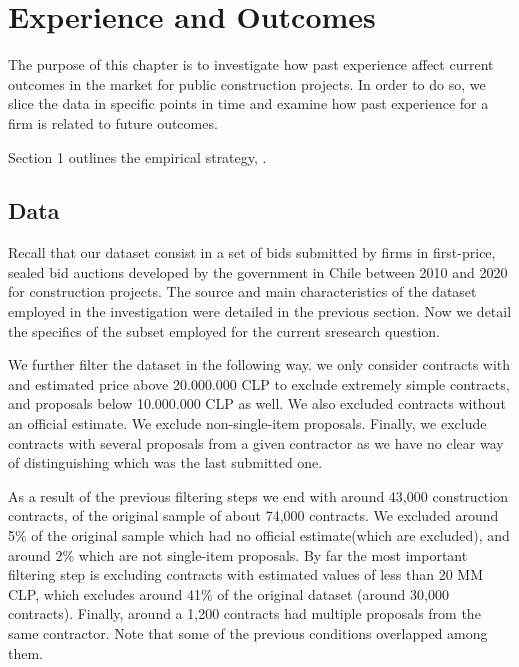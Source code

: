 \chapter{Experience and Outcomes
}
The purpose of this chapter is to investigate how past experience affect current outcomes in the market for public construction projects. In order to do so, we slice the data in specific points in time and examine how past experience for a firm is related to future outcomes.

 Section 1 outlines the empirical strategy, .

\section{Data}
Recall that our dataset consist in a set of bids submitted by firms in first-price, sealed bid auctions developed by the government in Chile between 2010 and 2020 for construction projects. The source and main characteristics of the dataset employed in the investigation were detailed in the previous section. Now we detail the specifics of the subset employed for the current sresearch question.

 We further filter the dataset in the following way. we only consider contracts with and estimated price above 20.000.000 CLP to exclude extremely simple contracts, and proposals below 10.000.000 CLP as well. We also excluded contracts without an official estimate. We exclude non-single-item proposals. Finally, we exclude contracts with several proposals from a given contractor as we have no clear way of distinguishing which was the last submitted one.

As a result of the previous filtering steps we end with around 43,000 construction contracts, of the original sample of about 74,000 contracts. We excluded around 5\% of the original sample which had no  official estimate(which are excluded), and around 2\% which are not single-item proposals. By far the most important filtering step is excluding contracts with estimated values of less than 20 MM CLP, which excludes around 41\% of the original dataset (around 30,000 contracts). Finally, around a 1,200 contracts had multiple proposals from the same contractor. Note that some of the previous conditions overlapped among them.

